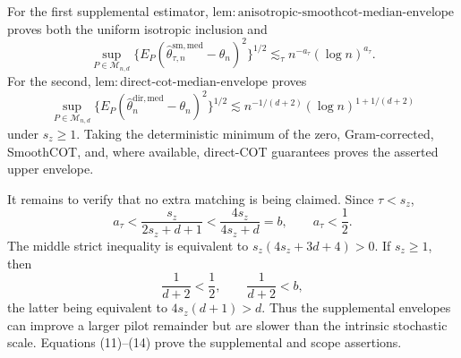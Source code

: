 For the first supplemental estimator, \(\mathrm{lem{:}anisotropic\text{-}smoothcot\text{-}median\text{-}envelope}\) proves both the uniform isotropic inclusion and
\[
\sup_{P\in\mathcal M_{n,d}}
\{E_P(\widehat\theta^{\mathrm{sm,med}}_{\tau,n}-\theta_n)^2\}^{1/2}
\lesssim_\tau n^{-a_\tau}(\log n)^{a_\tau}.                       \tag{11}
\]
For the second, \(\mathrm{lem{:}direct\text{-}cot\text{-}median\text{-}envelope}\) proves
\[
\sup_{P\in\mathcal M_{n,d}}
\{E_P(\widehat\theta_n^{\mathrm{dir,med}}-\theta_n)^2\}^{1/2}
\lesssim n^{-1/(d+2)}(\log n)^{1+1/(d+2)}                         \tag{12}
\]
under \(s_z\ge1\). Taking the deterministic minimum of the zero, Gram-corrected, SmoothCOT, and, where available, direct-COT guarantees proves the asserted upper envelope.

It remains to verify that no extra matching is being claimed. Since \(\tau<s_z\),
\[
a_\tau<\frac{s_z}{2s_z+d+1}<\frac{4s_z}{4s_z+d}=b,
\qquad a_\tau<\frac12.                                            \tag{13}
\]
The middle strict inequality is equivalent to \(s_z(4s_z+3d+4)>0\). If \(s_z\ge1\), then
\[
\frac1{d+2}<\frac12,
\qquad
\frac1{d+2}<b,                                                     \tag{14}
\]
the latter being equivalent to \(4s_z(d+1)>d\). Thus the supplemental envelopes can improve a larger pilot remainder but are slower than the intrinsic stochastic scale. Equations (11)--(14) prove the supplemental and scope assertions.